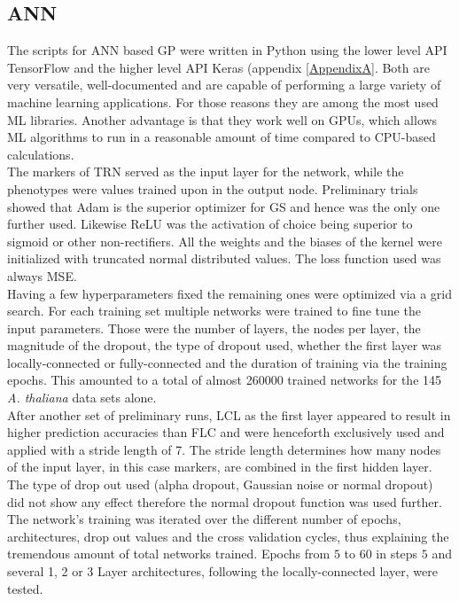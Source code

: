 \subsection{ANN}
The scripts for ANN based GP were written in Python using the lower level API TensorFlow
\cite{TF2016} and the higher level API Keras \cite{keras2015} (appendix
\ref{AppendixA}. Both are very versatile, well-documented and are capable of performing a
large variety of machine learning applications. For those reasons they are among the most
used ML libraries. Another advantage is that they work well on GPUs, which allows ML
algorithms to run in a reasonable amount of time compared to CPU-based calculations. \\
The markers of TRN served as the input layer for the network, while the phenotypes were
values trained upon in the output node. Preliminary trials showed that Adam is the
superior optimizer for GS and hence was the only one further used. Likewise ReLU was the
activation of choice being superior to sigmoid or other non-rectifiers. All the weights
and the biases of the kernel were initialized with truncated normal distributed
values. The loss function used was always MSE. \\
Having a few hyperparameters fixed the remaining ones were optimized via a grid
search. For each training set multiple networks were trained to fine tune the input
parameters. Those were the number of layers, the nodes per layer, the magnitude of the
dropout, the type of dropout used, whether the first layer was locally-connected or
fully-connected and the duration of training via the training epochs. This amounted to a
total of almost 260000 trained networks for the 145 \textit{A. thaliana} data sets alone. \\
After another set of preliminary runs, LCL as the first layer appeared to result in higher
prediction accuracies than FLC and were henceforth exclusively used and applied with a
stride length of 7. The stride length determines how many nodes of the input layer, in
this case markers, are combined in the first hidden layer. The type of drop out used
(alpha dropout, Gaussian noise or normal dropout) did not show any effect therefore the
normal dropout function was used further. The network's training was iterated over the
different number of epochs, architectures, drop out values and the cross validation
cycles, thus explaining the tremendous amount of total networks trained. Epochs from $5$
to $60$ in steps $5$ and several 1, 2 or 3 Layer architectures, following the
locally-connected layer, were tested.

